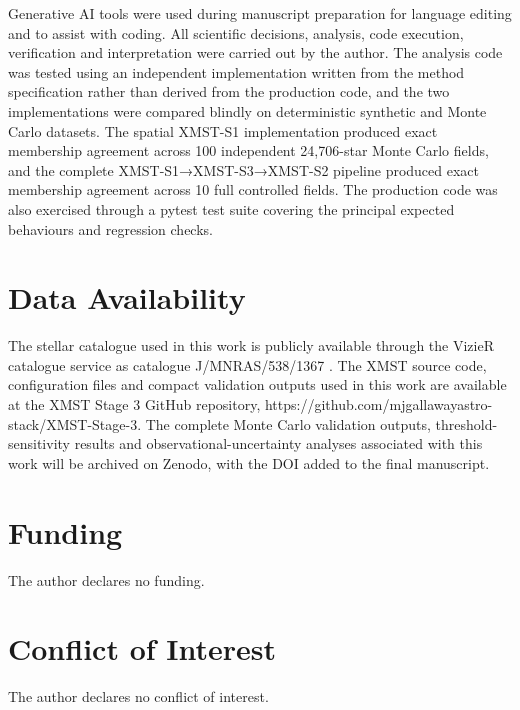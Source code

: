 \documentclass[fleqn,usenatbib]{rasti}
\begin{document}
Generative AI tools were used during manuscript preparation for language editing and to assist with coding. All scientific decisions, analysis, code execution, verification and interpretation were carried out by the author. The analysis code was tested using an independent implementation written from the method specification rather than derived from the production code, and the two implementations were compared blindly on deterministic synthetic and Monte Carlo datasets. The spatial XMST-S1 implementation produced exact membership agreement across 100 independent 24,706-star Monte Carlo fields, and the complete XMST-S1→XMST-S3→XMST-S2 pipeline produced exact membership agreement across 10 full controlled fields. The production code was also exercised through a pytest test suite covering the principal expected behaviours and regression checks.
\section*{Data Availability}

The stellar catalogue used in this work is publicly available through the
VizieR catalogue service as catalogue J/MNRAS/538/1367
\citep{Quintana2025}. 
The XMST source code, configuration files and compact
validation outputs used in this work are available at the XMST Stage 3 GitHub
repository, https://github.com/mjgallawayastro-stack/XMST-Stage-3.
The complete Monte Carlo validation outputs, threshold-sensitivity results and
observational-uncertainty analyses associated with this work will be archived
on Zenodo, with the DOI added to the final manuscript.


\section*{Funding}

The author declares no funding.

\section*{Conflict of Interest}

The author declares no conflict of interest.





\end{document}

